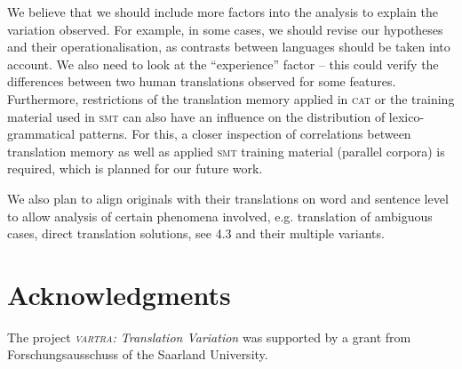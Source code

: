 \documentclass[output=paper]{LSP/langsci}
\begin{document}
We believe that we should include more factors into the analysis to explain the variation observed. For example, in some cases, we should revise our hypotheses and their operationalisation, as contrasts between languages should be taken into account. We also need to look at the “experience” factor – this could verify the differences between two human translations observed for some features. Furthermore, restrictions of the translation memory applied in \textsc{cat} or the training material used in \textsc{smt} can also have an influence on the distribution of lexico-grammatical patterns. For this, a closer inspection of correlations between translation memory as well as applied \textsc{smt} training material (parallel corpora) is required, which is planned for our future work.

We also plan to align originals with their translations on word and sentence level to allow analysis of certain phenomena involved, e.g. translation of ambiguous cases, direct translation solutions, see 4.3 and their multiple variants.

\section*{Acknowledgments}
The project \textit{\textsc{vartra}: Translation Variation} was supported by a grant from Forschungsausschuss of the Saarland University.


\printbibliography[heading=subbibliography,notkeyword=this]
\end{document}
